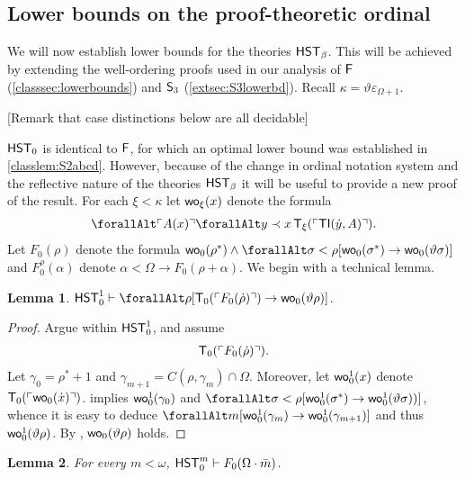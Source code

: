 \documentclass[UKenglish,cleveref,DIV=12]{scrartcl}
\let\forall\forallAlt
\newtheorem{lemma}{Lemma}
\theoremstyle{definition}
\theoremstyle{definition}
\begin{document}
\subsection{Lower bounds on the proof-theoretic ordinal}\label{extsec:Fblower}

We will now establish lower bounds for the theories $\mathsf{HST}_\beta$. This will be achieved by extending the well-ordering proofs used in our analysis of $\mathsf{F}$ (\cref{classsec:lowerbounds}) and $\mathsf{S}_3$ (\cref{extsec:S3lowerbd}). Recall $\kappa=\vartheta\varepsilon_{\Omega+1}$.

[Remark that case distinctions below are all decidable]


$\mathsf{HST}_0$ is identical to $\mathsf{F}$, for which an optimal lower bound was established
in \cref{classlem:S2abcd}. However, because of the change in ordinal notation
system and the reflective nature of the theories $\mathsf{HST}_\beta$ it will be useful
to provide a new proof of the result.
For each $\xi<\kappa$ let $\mathsf{wo}_\xi(x)$ denote the formula
\begin{align*}
  \forall\gn {A(x)}\forall y\prec x\,\T_\xi(\gn{\TI(\dot y,A)}).
\end{align*}
Let $F_0(\rho)$ denote the formula $\wo_0(\rho^*)\land \forall\sigma<\rho[
\wo_0(\sigma^*)\rightarrow \wo_0(\vartheta\sigma)]$ and $F_0^\rho(\alpha)$ denote
$\alpha<\Omega\rightarrow F_0(\rho+\alpha)$. We begin with a technical lemma.
\begin{lemma}\label{extlem:F0tech}
 $\HST_0^1\proves \forall\rho[\T_0(\gn{F_0(\dot\rho)})\rightarrow \wo_0(\vartheta\rho)]$.
\end{lemma}
\begin{proof}
Argue within $\mathsf{HST}_0^1$, and assume
\begin{align}\label{eqn:F0tech1}
  \mathsf{T}_0(\ulcorner{F_0(\dot\rho)}\urcorner).
\end{align}
Let $\gamma_0=\rho^*+1$ and $\gamma_{m+1}=C(\rho,\gamma_m)\cap\Omega$.
Moreover, let $\mathsf{wo}_0^1(x)$ denote $\mathsf{T}_0(\ulcorner{\mathsf{wo}_0(\dot x)}\urcorner)$.
 implies $\mathsf{wo}_0^1(\gamma_0)$ and
$\forall\sigma<\rho[\wo_0^1(\sigma^*)\rightarrow\wo_0^1(\vartheta\sigma))]$, whence
it is easy to deduce $\forall m[\wo_0^1(\gamma_m)\rightarrow\wo_0^1(\gamma_{m+1})]$
and thus $\mathsf{wo}_0^1(\vartheta\rho)$. By , $\mathsf{wo}_0(\vartheta\rho)$ holds.
\end{proof}
\begin{lemma}\label{extprop:F0wellordering}
  For every $m<\omega$, $\mathsf{HST}_0^m\vdash F_0(\Omega\cdot\bar{m})$.
\end{lemma}
\end{document}
